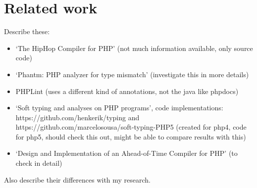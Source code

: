\documentclass[../main.tex]{subfiles}
\begin{document}
    
    \section{Related work}
    Describe these:
    \begin{itemize}
        \item `The HipHop Compiler for PHP'\cite{Zhao:12} (not much information available, only source code)
        \item `Phantm: PHP analyzer for type mismatch'\cite{Kne:10,Bar:10} (investigate this in more details)
        \item PHPLint \footnotemark (uses a different kind of annotations, not the java like phpdocs)
        \item `Soft typing and analyses on PHP programs'\cite{}, code implementations: https://github.com/henkerik/typing and https://github.com/marcelosousa/soft-typing-PHP5 (created for php4, code for php5, should check this out, might be able to compare results with this)
        \item `Design and Implementation of an Ahead-of-Time Compiler for PHP'\cite{Big:10} (to check in detail)
    \end{itemize}
    Also describe their differences with my research.
    
\end{document}
